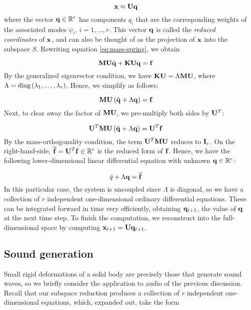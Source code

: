 \begin{equation}
\mathbf{x} \approx \mathbf{U} \mathbf{q}
\end{equation}
where the vector $\mathbf{q} \in \mathbb{R}^{r}$ has components $q_i$ that are the corresponding weights of the associated modes $\psi_i$, $i=1,\dots,r$. This vector $\mathbf{q}$ is called the {\em reduced coordinates} of $\mathbf{x}$, and can also be thought of as the projection of $\mathbf{x}$ into the subspace $S$. Rewriting equation \ref{eq:mass-spring}, we obtain

\begin{equation}
\mathbf{M} {\mathbf{U} \ddot{\mathbf{q}}} + \mathbf{K} \mathbf{U} \mathbf{q} = \mathbf{f}
\end{equation}
By the generalized eigenvector condition, we have $\mathbf{K} \mathbf{U} = \Lambda \mathbf{M} \mathbf{U}$, where $\Lambda = \textnormal{diag}\left(\lambda_1, \dots, \lambda_r\right)$. Hence, we simplify as follows:

\begin{equation}
\mathbf{M} \mathbf{U} \left(\ddot{\mathbf{q}} + \Lambda \mathbf{q}\right) = \mathbf{f}
\end{equation}
Next, to clear away the factor of $\mathbf{M} \mathbf{U}$, we pre-multiply both sides by $\mathbf{U}^{T}$:

\begin{equation}
\mathbf{U}^{T} \mathbf{M} \mathbf{U} \left(\ddot{\mathbf{q}} + \Lambda \mathbf{q}\right)= \mathbf{U}^{T} \mathbf{f}
\end{equation}
By the mass-orthogonality condition, the term $\mathbf{U}^{T} \mathbf{M} \mathbf{U}$ reduces to $\mathbf{I}_r$.  On the right-hand-side, $\widetilde{\mathbf{f}} = \mathbf{U}^{T} \mathbf{f} \in \mathbb{R}^r$ is the reduced form of $\mathbf{f}$. Hence, we have the following lower-dimensional linear differential equation with unknown $\mathbf{q} \in \mathbb{R}^{r}$:

\begin{equation}
\ddot{q} + \Lambda \mathbf{q} = \widetilde{\mathbf{f}}
\end{equation}
In this particular case, the system is uncoupled since $\Lambda$ is diagonal, so we have a collection of $r$ independent one-dimensional ordinary differential equations. These can be integrated forward in time very efficiently, obtaining $\mathbf{q}_{t+1}$, the value of $\mathbf{q}$ at the next time step. To finish the computation, we reconstruct into the full-dimensional space by computing $\mathbf{x}_{t+1} = \mathbf{U} \mathbf{q}_{t+1}$.

\subsection{Sound generation}
Small rigid deformations of a solid body are precisely those that generate sound waves, so we briefly consider the application to audio of the previous discussion. Recall that our subspace reduction produces a collection of $r$ independent one-dimensional equations, which, expanded out, take the form

